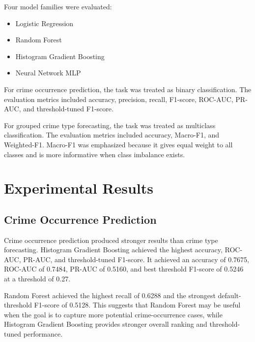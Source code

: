 \documentclass[conference]{IEEEtran}
\begin{document}
Four model families were evaluated:
\begin{itemize}
    \item Logistic Regression
    \item Random Forest
    \item Histogram Gradient Boosting
    \item Neural Network MLP
\end{itemize}

For crime occurrence prediction, the task was treated as binary classification. The evaluation metrics included accuracy, precision, recall, F1-score, ROC-AUC, PR-AUC, and threshold-tuned F1-score.

For grouped crime type forecasting, the task was treated as multiclass classification. The evaluation metrics included accuracy, Macro-F1, and Weighted-F1. Macro-F1 was emphasized because it gives equal weight to all classes and is more informative when class imbalance exists.

\section{Experimental Results}

\subsection{Crime Occurrence Prediction}

Crime occurrence prediction produced stronger results than crime type forecasting. Histogram Gradient Boosting achieved the highest accuracy, ROC-AUC, PR-AUC, and threshold-tuned F1-score. It achieved an accuracy of 0.7675, ROC-AUC of 0.7484, PR-AUC of 0.5160, and best threshold F1-score of 0.5246 at a threshold of 0.27.

Random Forest achieved the highest recall of 0.6288 and the strongest default-threshold F1-score of 0.5128. This suggests that Random Forest may be useful when the goal is to capture more potential crime-occurrence cases, while Histogram Gradient Boosting provides stronger overall ranking and threshold-tuned performance.

\begin{table}[htbp]
\caption{Crime Occurrence Prediction Results}
\centering
{}
\label{tab:occurrence_results}
\end{table}
\end{document}
